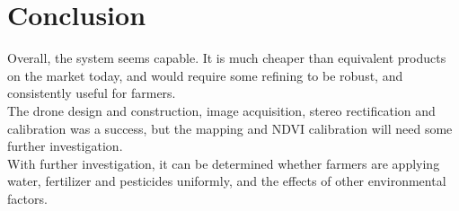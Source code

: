 \setcounter{secnumdepth}{2}


\label{chapter:intro}

\label{chapter:literature}





\chapter{Conclusion}

Overall, the system seems capable. It is much cheaper than equivalent products on the market today, and would require some refining to be robust, and consistently useful for farmers.\\

The drone design and construction, image acquisition, stereo rectification and calibration was a success, but the mapping and NDVI calibration will need some further investigation.\\

With further investigation, it can be determined whether farmers are applying water, fertilizer and pesticides uniformly, and the effects of other environmental factors.\\










